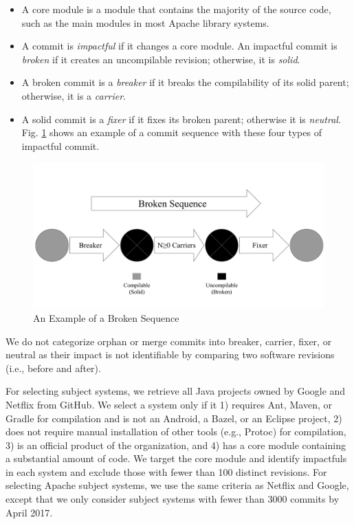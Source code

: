 \begin{itemize}
\item A core module is a module that contains the majority of the source code, such as the main modules in most Apache library systems.
\item A commit is \textit{impactful} if it changes a core module.
An impactful commit is \textit{broken} if it creates an uncompilable revision; otherwise, it is \textit{solid}.
\item A broken commit is a \textit{breaker} if it breaks the compilability of its solid parent; otherwise, it is a \textit{carrier}.
\item A solid commit is a \textit{fixer} if it fixes its broken parent; otherwise it is \textit{neutral}.
Fig. \ref{fig:sequence} shows an example of a commit sequence with these four types of impactful commit.
\end{itemize}

\begin{figure}[htbp]
    \centerline{\includegraphics[scale=0.3]{figures/sequence.pdf}}
    \caption{An Example of a Broken Sequence}
    \label{fig:sequence}
    \end{figure}

We do not categorize orphan or merge commits into breaker, carrier, fixer, or neutral as their impact is not identifiable by comparing two software revisions (i.e., before and after).

For selecting subject systems, we retrieve all Java projects owned by Google and Netflix from GitHub.
We select a system only if it 1) requires Ant, Maven, or Gradle for compilation and is not an Android, a Bazel, or an Eclipse project, 2) does not require manual installation of other tools (e.g., Protoc) for compilation, 3) is an official product of the organization, and 4) has a core module containing a substantial amount of code.
We target the core module and identify impactfuls in each system and exclude those with fewer than 100 distinct revisions.
For selecting Apache subject systems, we use the same criteria as Netflix and Google, except that we only consider subject systems with fewer than 3000 commits by April 2017.

